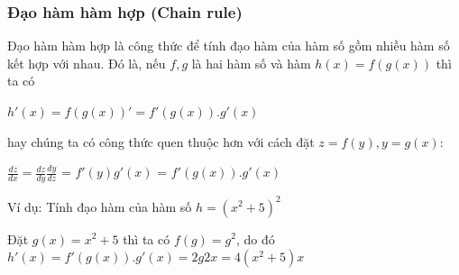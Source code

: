 \subsubsection{Đạo hàm hàm hợp (Chain rule)}

\hspace{5mm} Đạo hàm hàm hợp là công thức để tính đạo hàm của hàm số gồm nhiều hàm số kết hợp với nhau. Đó là, nếu $f, g$ là hai hàm số và hàm $h(x) = f(g(x))$ thì ta có 
\begin{center}
$h'(x) = f(g(x))' = f'(g(x)).g'(x) $

\end{center}
hay chúng ta có công thức quen thuộc hơn với cách đặt $z=f(y), y=g(x)$:
\begin{center}
$\frac{dz}{dx} = \frac{dz}{dy} \frac{dy}{dz}$ = $f'(y)g'(x)$ = $f'(g(x)).g'(x)$
\end{center}

Ví dụ: Tính đạo hàm của hàm số $h=(x^2+5)^2$\par
 Đặt $g(x) = x^2 +5$ thì ta có $f(g) = g^2$, do đó $h'(x) = f'(g(x)).g'(x) = 2g2x= 4(x^2 +5)x$\par
